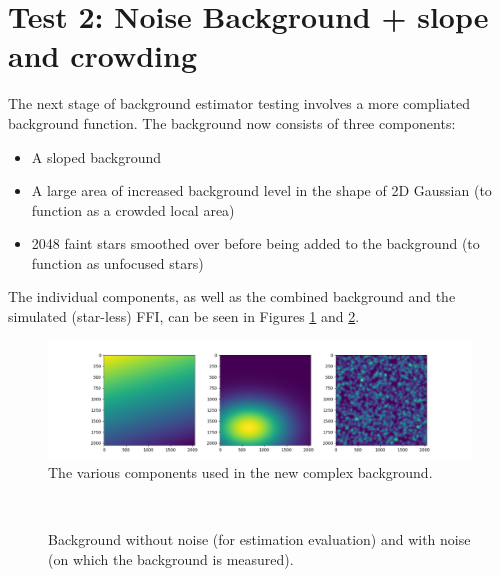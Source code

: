 \documentclass[10pt, a4paper]{article}
\begin{document}
\section{Test 2: Noise Background + slope and crowding}
The next stage of background estimator testing involves a more compliated background function. The background now consists of three components:

\begin{itemize}
\item A sloped background
\item A large area of increased background level in the shape of 2D Gaussian (to function as a crowded local area)
\item 2048 faint stars smoothed over before being added to the background (to function as unfocused stars)
\end{itemize}

The individual components, as well as the combined background and the simulated (star-less) FFI, can be seen in Figures \ref{fig:bkgcomponents} and \ref{fig:complexbkg}.

\begin{figure}
\centering
\includegraphics[width=\textwidth]{bkgcomponents}
\caption{The various components used in the new complex background.}
\label{fig:bkgcomponents}
\end{figure}


\begin{figure}[!ht]
   \centering
   \quad
   \\
   \caption{Background without noise (for estimation evaluation) and with noise (on which the background is measured).}
   \label{fig:complexbkg}
\end{figure}
\end{document}
